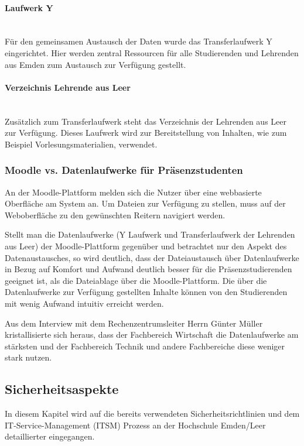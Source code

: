 \paragraph{Laufwerk Y}\mbox{} \\

Für den gemeinsamen Austausch der Daten wurde das Transferlaufwerk Y eingerichtet. Hier werden zentral Ressourcen für alle Studierenden und Lehrenden aus Emden zum Austausch zur Verfügung gestellt.

\paragraph{Verzeichnis Lehrende aus Leer}\mbox{} \\

Zusätzlich zum Transferlaufwerk steht das Verzeichnis der Lehrenden aus Leer  zur Verfügung. Dieses Laufwerk wird zur Bereitstellung von Inhalten, wie zum Beispiel Vorlesungsmaterialien, verwendet.

\subsubsection{Moodle vs. Datenlaufwerke für Präsenzstudenten}
An der Moodle-Plattform melden sich die Nutzer über eine webbasierte Oberfläche am System an. Um Dateien zur Verfügung zu stellen, muss auf der Weboberfläche zu den gewünschten Reitern navigiert werden.

Stellt man die Datenlaufwerke (Y Laufwerk und Transferlaufwerk der Lehrenden aus Leer) der Moodle-Plattform gegenüber und betrachtet nur den Aspekt des Datenaustausches, so wird deutlich, dass der Dateiaustausch über   Datenlaufwerke in Bezug auf Komfort und Aufwand deutlich besser für die Präsenzstudierenden geeignet ist, als die Dateiablage über die Moodle-Plattform. Die über die Datenlaufwerke zur Verfügung gestellten Inhalte können von den Studierenden mit wenig Aufwand intuitiv erreicht werden.

Aus dem Interview mit dem Rechenzentrumsleiter Herrn Günter Müller kristallisierte sich heraus, dass der Fachbereich Wirtschaft die Datenlaufwerke am stärksten und der Fachbereich Technik und andere Fachbereiche diese weniger stark nutzen.

\subsection{Sicherheitsaspekte}
In diesem Kapitel wird auf die bereits verwendeten Sicherheitsrichtlinien und dem IT-Service-Management (ITSM)  Prozess an der Hochschule Emden/Leer detaillierter eingegangen.

